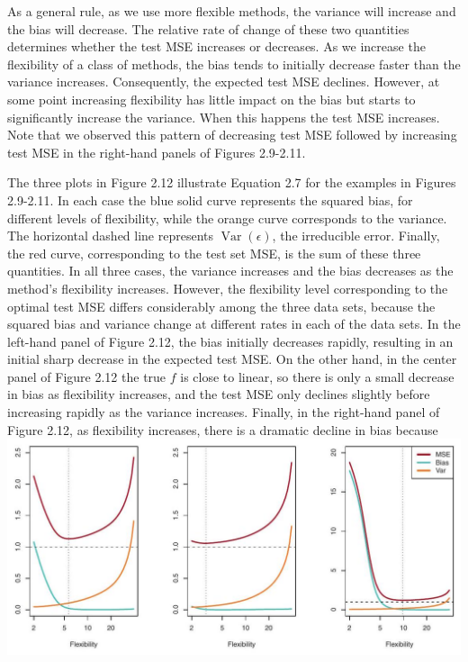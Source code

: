 \documentclass[10pt]{article}
\begin{document}
As a general rule, as we use more flexible methods, the variance will increase and the bias will decrease. The relative rate of change of these two quantities determines whether the test MSE increases or decreases. As we increase the flexibility of a class of methods, the bias tends to initially decrease faster than the variance increases. Consequently, the expected test MSE declines. However, at some point increasing flexibility has little impact on the bias but starts to significantly increase the variance. When this happens the test MSE increases. Note that we observed this pattern of decreasing test MSE followed by increasing test MSE in the right-hand panels of Figures 2.9-2.11.

The three plots in Figure 2.12 illustrate Equation 2.7 for the examples in Figures 2.9-2.11. In each case the blue solid curve represents the squared bias, for different levels of flexibility, while the orange curve corresponds to the variance. The horizontal dashed line represents $\operatorname{Var}(\epsilon)$, the irreducible error. Finally, the red curve, corresponding to the test set MSE, is the sum of these three quantities. In all three cases, the variance increases and the bias decreases as the method's flexibility increases. However, the flexibility level corresponding to the optimal test MSE differs considerably among the three data sets, because the squared bias and variance change at different rates in each of the data sets. In the left-hand panel of Figure 2.12, the bias initially decreases rapidly, resulting in an initial sharp decrease in the expected test MSE. On the other hand, in the center panel of Figure 2.12 the true $f$ is close to linear, so there is only a small decrease in bias as flexibility increases, and the test MSE only declines slightly before increasing rapidly as the variance increases. Finally, in the right-hand panel of Figure 2.12, as flexibility increases, there is a dramatic decline in bias because\\
\includegraphics[max width=\textwidth, center]{2025_05_05_efe77898333945044de4g-051}
\end{document}
